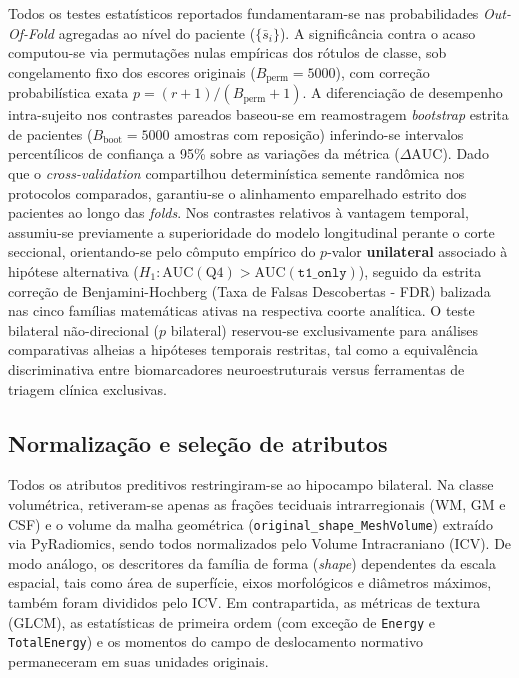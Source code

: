 \documentclass[review]{elsarticle}
\newcommand{\code}[1]{\texttt{#1}}
\begin{document}
Todos os testes estatísticos reportados fundamentaram-se nas probabilidades \emph{Out-Of-Fold} agregadas ao nível do paciente ($\{\bar{s}_i\}$). 
A significância contra o acaso computou-se via permutações nulas empíricas dos rótulos de classe, sob congelamento fixo dos escores originais ($B_{\mathrm{perm}}=5000$), com correção probabilística exata $p=(r+1)/(B_{\mathrm{perm}}+1)$. 
A diferenciação de desempenho intra-sujeito nos contrastes pareados baseou-se em reamostragem \emph{bootstrap} estrita de pacientes ($B_{\mathrm{boot}}=5000$ amostras com reposição) inferindo-se intervalos percentílicos de confiança a 95\% sobre as variações da métrica ($\Delta\mathrm{AUC}$).
Dado que o \emph{cross-validation} compartilhou determinística semente randômica nos protocolos comparados, garantiu-se o alinhamento emparelhado estrito dos pacientes ao longo das \emph{folds}. Nos contrastes relativos à vantagem temporal, assumiu-se previamente a superioridade do modelo longitudinal perante o corte seccional, orientando-se pelo cômputo empírico do $p$-valor \textbf{unilateral} associado à hipótese alternativa ($H_1\!: \mathrm{AUC}(\mathrm{Q4}) > \mathrm{AUC}(\code{t1\_only})$), seguido da estrita correção de Benjamini-Hochberg (Taxa de Falsas Descobertas - FDR) balizada nas cinco famílias matemáticas ativas na respectiva coorte analítica. O teste bilateral não-direcional ($p$ bilateral) reservou-se exclusivamente para análises comparativas alheias a hipóteses temporais restritas, tal como a equivalência discriminativa entre biomarcadores neuroestruturais versus ferramentas de triagem clínica exclusivas.

\subsection{Normalização e seleção de atributos}
\label{sec:feature-selection}

Todos os atributos preditivos restringiram-se ao hipocampo bilateral. Na classe volumétrica, retiveram-se apenas as frações teciduais intrarregionais (WM, GM e CSF) e o volume da malha geométrica (\code{original\_shape\_MeshVolume}) extraído via PyRadiomics, sendo todos normalizados pelo Volume Intracraniano (ICV). De modo análogo, os descritores da família de forma (\emph{shape}) dependentes da escala espacial, tais como área de superfície, eixos morfológicos e diâmetros máximos, também foram divididos pelo ICV. Em contrapartida, as métricas de textura (GLCM), as estatísticas de primeira ordem (com exceção de \code{Energy} e \code{TotalEnergy}) e os momentos do campo de deslocamento normativo permaneceram em suas unidades originais.
\end{document}

